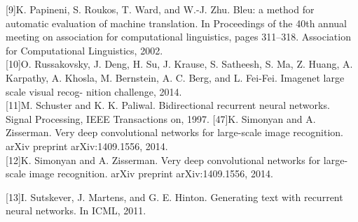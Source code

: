 \documentclass[12pt]{article}%
\begin{document}
%

[9]K. Papineni, S. Roukos, T. Ward, and W.-J. Zhu. Bleu: a method for automatic evaluation of machine translation. In Proceedings of the 40th annual meeting on association for computational linguistics, pages 311–318. Association for Computational Linguistics, 2002.\\

[10]O. Russakovsky, J. Deng, H. Su, J. Krause, S. Satheesh,
S. Ma, Z. Huang, A. Karpathy, A. Khosla, M. Bernstein,
A. C. Berg, and L. Fei-Fei. Imagenet large scale visual recog- nition challenge, 2014.\\

[11]M. Schuster and K. K. Paliwal. Bidirectional recurrent neural networks. Signal Processing, IEEE Transactions on, 1997. [47]K. Simonyan and A. Zisserman. Very deep convolutional
networks for large-scale image recognition. arXiv preprint
arXiv:1409.1556, 2014.\\


[12]K. Simonyan and A. Zisserman. Very deep convolutional
networks for large-scale image recognition. arXiv preprint
arXiv:1409.1556, 2014.
%

[13]I. Sutskever, J. Martens, and G. E. Hinton. Generating text with recurrent neural networks. In ICML, 2011.\\

%
\end{document}
